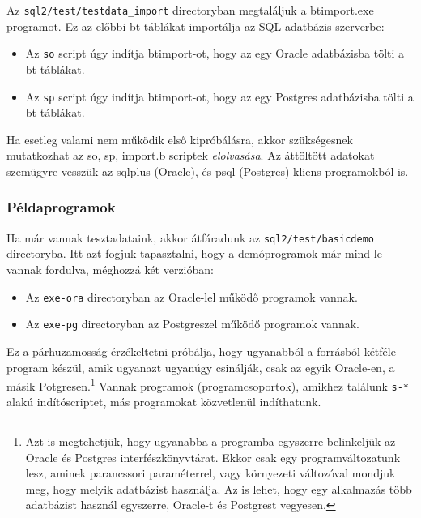 Az \verb!sql2/test/testdata_import! directoryban megtaláljuk
a btimport.exe programot. Ez az előbbi bt táblákat importálja
az SQL adatbázis szerverbe:
\begin{itemize}
\item
    Az \verb!so! script úgy indítja btimport-ot, 
    hogy az egy Oracle adatbázisba tölti a bt táblákat.
\item
    Az \verb!sp! script úgy indítja btimport-ot, 
    hogy az egy Postgres adatbázisba tölti a bt táblákat.
\end{itemize}
Ha esetleg valami nem működik első kipróbálásra,
akkor szükségesnek mutatkozhat az so, sp, import.b scriptek 
{\em elolvasása}. Az áttöltött adatokat szemügyre vesszük
az sqlplus (Oracle), és psql (Postgres) kliens programokból is.


\subsubsection*{Példaprogramok}

Ha már vannak tesztadataink, akkor átfáradunk az
\verb!sql2/test/basicdemo! directoryba. Itt azt fogjuk
tapasztalni, hogy a demóprogramok már mind le vannak 
fordulva, méghozzá két verzióban:
\begin{itemize}
\item 
    Az \verb!exe-ora! directoryban az Oracle-lel működő
    programok vannak.
\item 
    Az \verb!exe-pg! directoryban az Postgreszel működő
    programok vannak.
\end{itemize}
Ez a párhuzamosság érzékeltetni próbálja, hogy ugyanabból
a forrásból kétféle program készül, amik ugyanazt ugyanúgy 
csinálják, csak az egyik Oracle-en, a másik Potgresen.\footnote{
Azt is megtehetjük, hogy ugyanabba a programba egyszerre belinkeljük 
az Oracle és Postgres interfészkönyvtárat. Ekkor csak egy programváltozatunk
lesz, aminek parancssori paraméterrel, vagy környezeti változóval mondjuk
meg, hogy melyik adatbázist használja. Az is lehet, hogy egy alkalmazás
több adatbázist használ egyszerre, Oracle-t és Postgrest vegyesen.}  
Vannak programok (programcsoportok), amikhez találunk
\verb!s-*! alakú indítóscriptet, más programokat közvetlenül 
indíthatunk.

